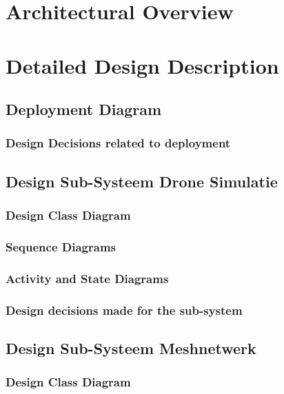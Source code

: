 \documentclass[a4paper, 11pt, oneside]{report}
\begin{document}
\chapter{Architectural Overview}
\label{architectural}
\chapter{Detailed Design Description}
\label{DetailedDesign}
\section{Deployment Diagram}
\label{DetailedDesign:deployment}
\subsection{Design Decisions related to deployment}
\label{DetailedDesign:deployment:decisisions}
\section{Design Sub-Systeem Drone Simulatie}
\label{DetailedDesign:DroneSimumlatie}
\subsection{Design Class Diagram}
\label{DetailedDesign:DroneSimumlatie:class}

\subsection{Sequence Diagrams}
\label{DetailedDesign:DroneSimumlatie:sequence}
\subsection{Activity and State Diagrams}
\label{DetailedDesign:DroneSimumlatie:Activity}
\subsection{Design decisions made for the sub-system}

\section{Design Sub-Systeem Meshnetwerk}
\label{DetailedDesign:MeshNetwerk}
\subsection{Design Class Diagram}
\label{DetailedDesign:MeshNetwerk:class}
\end{document}

